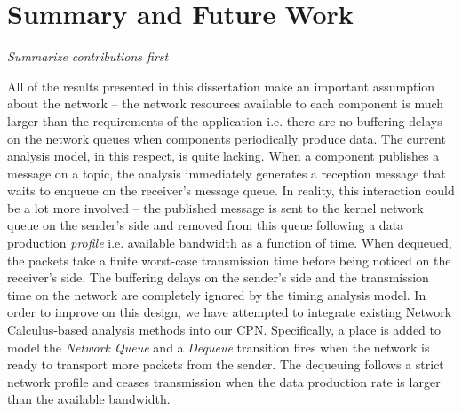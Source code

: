 \chapter{Summary and Future Work}
\label{chapter:conclusion}

\emph{Summarize contributions first}

All of the results presented in this dissertation make an important assumption about the network -- the network resources available to each component is much larger than the requirements of the application i.e. there are no buffering delays on the network queues when components periodically produce data. The current analysis model, in this respect, is quite lacking. When a component publishes a message on a topic, the analysis immediately generates a reception message that waits to enqueue on the receiver's message queue. In reality, this interaction could be a lot more involved -- the published message is sent to the kernel network queue on the sender's side and removed from this queue following a data production \emph{profile} i.e. available bandwidth as a function of time. When dequeued, the packets take a finite worst-case transmission time before being noticed on the receiver's side. The buffering delays on the sender's side and the transmission time on the network are completely ignored by the timing analysis model. In order to improve on this design, we have attempted to integrate existing Network Calculus-based analysis methods \cite{ISIS_F6_CYPHY:14} into our CPN. Specifically, a place is added to model the \emph{Network Queue} and a \emph{Dequeue} transition fires when the network is ready to transport more packets from the sender. The dequeuing follows a strict network profile and ceases transmission when the data production rate is larger than the available bandwidth. 

